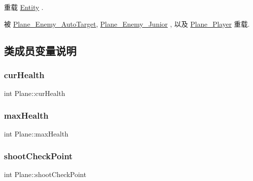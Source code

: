 重载 \hyperlink{class_entity_a00b6eeaf99b35c8f8b10b5fbfc1baf4f}{Entity} .



被 \hyperlink{class_plane___enemy___auto_target_acae2a6f38bdc71d17188e2b7711f4d5b}{Plane\+\_\+\+Enemy\+\_\+\+Auto\+Target}, \hyperlink{class_plane___enemy___junior_a686e46c9927793dd07235cac72d52405}{Plane\+\_\+\+Enemy\+\_\+\+Junior} , 以及 \hyperlink{class_plane___player_ae68c08ce11fad9fd164c00eb4db6b348}{Plane\+\_\+\+Player} 重载.



\subsection{类成员变量说明}
\mbox{\label{class_plane_a0434f35fe3f56acb865e51c042e43df8}} 
\subsubsection{\texorpdfstring{cur\+Health}{curHealth}}
{\footnotesize\ttfamily int Plane\+::cur\+Health}

\mbox{\label{class_plane_ac39ded6721a8137c4a8044adfbfb8a6c}} 
\subsubsection{\texorpdfstring{max\+Health}{maxHealth}}
{\footnotesize\ttfamily int Plane\+::max\+Health}

\mbox{\label{class_plane_a36cb09c56fbf7b8c28506d8dd70f07cb}} 
\subsubsection{\texorpdfstring{shoot\+Check\+Point}{shootCheckPoint}}
{\footnotesize\ttfamily int Plane\+::shoot\+Check\+Point\hspace{0.3cm}{\ttfamily [protected]}}

\mbox{\label{class_plane_ae9f4ab92b0aa75cff1f14df37980eabd}} 
